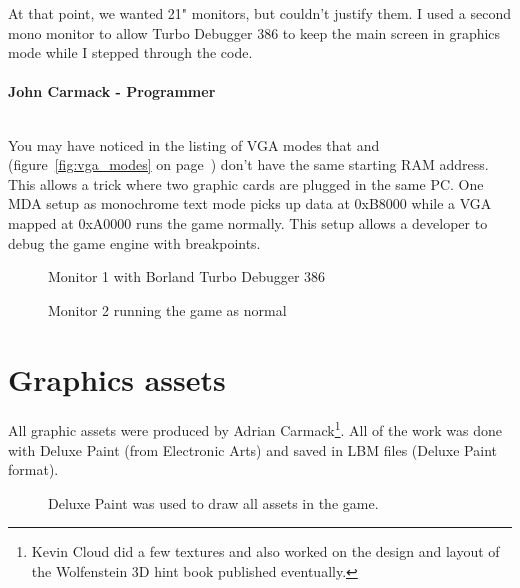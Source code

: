 \documentclass[book.tex]{subfiles}
\begin{document}
\begin{fancyquotes}
At that point, we wanted 21" monitors, but couldn't justify them.  I used a second mono monitor to allow Turbo Debugger 386 to keep the main screen in graphics mode while I stepped through the code.\\
 \\
\textbf{John Carmack - Programmer}
\end{fancyquotes}
\\
You may have noticed in the listing of VGA modes that  and  (figure~\ref{fig:vga_modes} on page~\pageref{fig:vga_modes})  don't have the same starting RAM address. This allows a trick where two graphic cards are plugged in the same PC. One MDA setup as monochrome text mode picks up data at 0xB8000 while a VGA mapped at 0xA0000 runs the game normally. This setup allows a developer to debug the game engine with breakpoints.\\
\begin{figure}[H]
\centering
\caption{Monitor 1 with Borland Turbo Debugger 386}
\label{fig:dm1}
\end{figure}

\begin{figure}[H]
\centering
\caption{Monitor 2 running the game as normal}
\label{fig:dm1}
\end{figure}



 
 
 




\section{Graphics assets}

All graphic assets were produced by Adrian Carmack\footnote{Kevin Cloud did a few textures and also worked on the design and layout of the Wolfenstein 3D hint book published eventually.}. All of the work was done with Deluxe Paint (from Electronic Arts) and saved in LBM files (Deluxe Paint format). 

\begin{figure}[H]
  \centering
 \caption{Deluxe Paint was used to draw all assets in the game.}
\end{figure}
\end{document}
